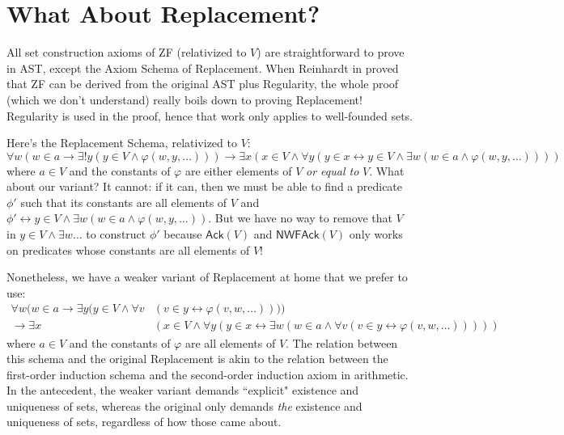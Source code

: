 \documentclass{article}
\begin{document}
\section{What About Replacement?}
All set construction axioms of ZF (relativized to $V$) are straightforward to prove in AST, except the Axiom Schema of Replacement. When Reinhardt in \cite{reinhardt} proved that ZF can be derived from the original AST plus Regularity, the whole proof (which we don't understand) really boils down to proving Replacement! Regularity is used in the proof, hence that work only applies to well-founded sets.

Here's the Replacement Schema, relativized to $V$:
$$\forall w(w \in a \rightarrow \exists! y(y \in V \wedge \varphi(w, y, \ldots))) \rightarrow \exists x(x \in V \wedge \forall y(y \in x \leftrightarrow y \in V \wedge \exists w(w \in a \wedge \varphi(w, y, \ldots))))$$
where $a \in V$ and the constants of $\varphi$ are either elements of $V$ \textit{or equal to} $V$. What about our variant? It cannot: if it can, then we must be able to find a predicate $\phi'$ such that its constants are all elements of $V$ and $\phi' \leftrightarrow y \in V \wedge \exists w( w \in a \wedge \varphi(w, y, \ldots))$. But we have no way to remove that $V$ in $y \in V \wedge \exists w \ldots$ to construct $\phi'$ because $\textsf{Ack}(V)$ and $\textsf{NWFAck}(V)$ only works on predicates whose constants are all elements of $V$!

Nonetheless, we have a weaker variant of Replacement at home that we prefer to use:
\begin{align*}
    \forall w(w \in a \rightarrow \exists y(y \in V \wedge \forall v &(v \in y \leftrightarrow \varphi(v, w, \ldots)))) \\ \rightarrow \exists x &(x \in V \wedge \forall y(y \in x \leftrightarrow \exists w(w \in a \wedge \forall v (v \in y \leftrightarrow \varphi(v, w, \ldots)))))
\end{align*}
where $a \in V$ and the constants of $\varphi$ are all elements of $V$. The relation between this schema and the original Replacement is akin to the relation between the first-order induction schema and the second-order induction axiom in arithmetic. In the antecedent, the weaker variant demands ``explicit" existence and uniqueness of sets, whereas the original only demands \textit{the} existence and uniqueness of sets, regardless of how those came about.



\end{document}
